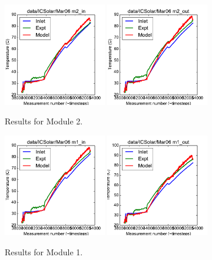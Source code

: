 \documentclass{article}
\begin{document}
\clearpage
\begin{figure}[!ht]
\centering
\includegraphics[width=0.4\textwidth]{../../data/ICSolar/images/Mar06_m2_in_unsteady.pdf}\hspace{0.05\textwidth}
\includegraphics[width=0.4\textwidth]{../../data/ICSolar/images/Mar06_m2_out_unsteady.pdf}\hspace{0.05\textwidth}\\
\caption{Results for Module 2.}\end{figure}
\begin{figure}[!ht]
\centering
\includegraphics[width=0.4\textwidth]{../../data/ICSolar/images/Mar06_m1_in_unsteady.pdf}\hspace{0.05\textwidth}
\includegraphics[width=0.4\textwidth]{../../data/ICSolar/images/Mar06_m1_out_unsteady.pdf}\hspace{0.05\textwidth}\\
\caption{Results for Module 1.}\end{figure}
\end{document}
